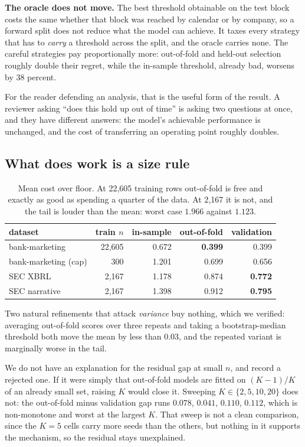 \documentclass[11pt]{article}
\begin{document}
\textbf{The oracle does not move.} The best threshold obtainable on the test block costs the same
whether that block was reached by calendar or by company, so a forward split does not reduce what
the model can achieve. It taxes every strategy that has to \emph{carry} a threshold across the
split, and the oracle carries none. The careful strategies pay proportionally more: out-of-fold
and held-out selection roughly double their regret, while the in-sample threshold, already bad,
worsens by 38 percent.

For the reader defending an analysis, that is the useful form of the result. A reviewer asking
``does this hold up out of time'' is asking two questions at once, and they have different
answers: the model's achievable performance is unchanged, and the cost of transferring an
operating point roughly doubles.

\subsection{What does work is a size rule}

\begin{table}[t]
\centering\small
\begin{tabular}{lrrrr}
\toprule
dataset & train $n$ & in-sample & out-of-fold & validation \\
\midrule
bank-marketing        & 22{,}605 & 0.672 & \textbf{0.399} & 0.399 \\
bank-marketing (cap)  & 300      & 1.201 & 0.699 & 0.656 \\
SEC XBRL              & 2{,}167  & 1.178 & 0.874 & \textbf{0.772} \\
SEC narrative         & 2{,}167  & 1.398 & 0.912 & \textbf{0.795} \\
\bottomrule
\end{tabular}
\caption{Mean cost over floor. At 22{,}605 training rows out-of-fold is free and exactly as good
as spending a quarter of the data. At 2{,}167 it is not, and the tail is louder than the mean:
worst case $1.966$ against $1.123$.}
\label{tab:size}
\end{table}

Two natural refinements that attack \emph{variance} buy nothing, which we verified: averaging
out-of-fold scores over three repeats and taking a bootstrap-median threshold both move the mean
by less than $0.03$, and the repeated variant is marginally worse in the tail.

We do not have an explanation for the residual gap at small $n$, and record a rejected one. If it
were simply that out-of-fold models are fitted on $(K{-}1)/K$ of an already small set, raising $K$
would close it. Sweeping $K \in \{2, 5, 10, 20\}$ does not: the out-of-fold minus validation gap
runs $0.078$, $0.041$, $0.110$, $0.112$, which is non-monotone and worst at the largest $K$. That
sweep is not a clean comparison, since the $K{=}5$ cells carry more seeds than the others, but
nothing in it supports the mechanism, so the residual stays unexplained.
\end{document}
